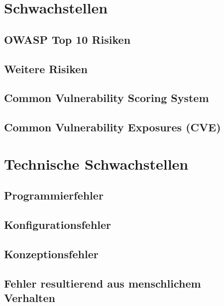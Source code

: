 \section{Schwachstellen}

\subsection{OWASP Top 10 Risiken}

\subsection{Weitere Risiken}

\subsection{Common Vulnerability Scoring System}

\subsection{Common Vulnerability Exposures (CVE)}

\section{Technische Schwachstellen}

\subsection{Programmierfehler}

\subsection{Konfigurationsfehler}

\subsection{Konzeptionsfehler}

\subsection{Fehler resultierend aus menschlichem Verhalten}